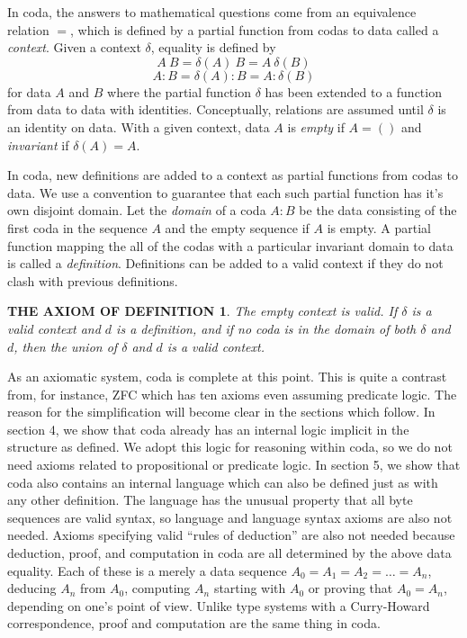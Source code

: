 \documentclass[11pt]{article}
\begin{document}
     In coda, the answers to mathematical questions come from an equivalence relation $=$, which is defined by a partial function from codas to data
called a {\it context}.  Given a context $\delta$, equality is defined by
\begin{equation} \label{eqn}
	A\ B = \delta(A)\ B = A\ \delta(B)
\end{equation}
\begin{equation} \label{eqn}
	A:B = \delta(A):B = A:\delta(B)
\end{equation}
for data $A$ and $B$ where the partial function $\delta$ has been extended to a function from data to data with identities.
Conceptually, relations are assumed until $\delta$ is an identity on data.  With a given context, data $A$ is {\it empty} if $A=()$ and {\it invariant}
if $\delta(A)=A$.

     In coda, new definitions are added to a context as partial functions from codas to data.  We use a convention to guarantee that each such partial
function has it's own disjoint domain.  Let the {\it domain} of a coda $A:B$ be the data consisting of the first coda in the sequence $A$ and the empty
sequence if $A$ is empty.  A partial function mapping the all of the codas with a particular invariant domain to data is called a {\it definition}.  Definitions
can be added to a valid context if they do not clash with previous definitions.

\newtheorem*{remark}{THE AXIOM OF DEFINITION}
\begin{remark}  The empty context is valid.  If $\delta$ is a valid context and $d$ is a definition, and if no coda is in
the domain of both $\delta$ and $d$, then the union of $\delta$ and $d$ is a valid context.
\end{remark}
\noindent As an axiomatic system, coda is complete at this point.  This is quite a contrast from, for instance, ZFC which has ten axioms 
even assuming predicate logic.  The reason for the simplification will become clear in the sections which follow.  In section 4, we show 
that coda already has an internal logic implicit in the structure as defined.  We adopt this logic for reasoning within coda, so we do not 
need axioms related to propositional or predicate logic.  In section 5, we show that coda also contains an internal language which can 
also be defined just as with any other definition.  The language has the unusual property that all byte sequences are valid syntax, 
so language and language syntax axioms are also not needed.  Axioms specifying valid ``rules of deduction'' are also not needed 
because deduction, proof, and computation in coda are all determined by the above data equality.  Each of these is a merely a data sequence $A_0=A_1=A_2=\dots=A_n$, 
deducing $A_n$ from $A_0$, computing $A_n$ starting with $A_0$ or proving that $A_0=A_n$, depending on one's point of view.  
Unlike type systems with a Curry-Howard correspondence, proof and computation are the same thing in coda. 
\end{document}
